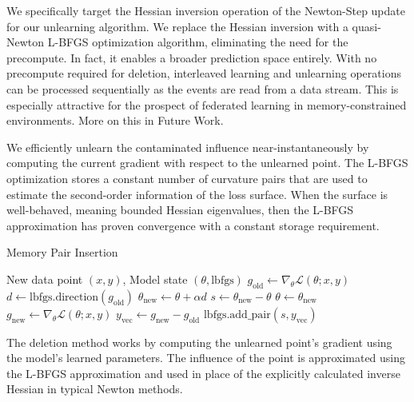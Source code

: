 \documentclass[a4paper,12pt]{article}
\begin{document}
We specifically target the Hessian inversion operation of the Newton-Step update for our unlearning algorithm. We replace the Hessian inversion with a quasi-Newton L-BFGS optimization algorithm, eliminating the need for the precompute. In fact, it enables a broader prediction space entirely. With no precompute required for deletion, interleaved learning and unlearning operations can be processed sequentially as the events are read from a data stream. This is especially attractive for the prospect of federated learning in memory-constrained environments. More on this in Future Work.

We efficiently unlearn the contaminated influence near-instantaneously by computing the current gradient with respect to the unlearned point. The L-BFGS optimization stores a constant number of curvature pairs that are used to estimate the second-order information of the loss surface. When the surface is well-behaved, meaning bounded Hessian eigenvalues, then the L-BFGS approximation has proven convergence with a constant storage requirement.

\begin{algorithm}
\caption{Memory Pair Insertion}\label{alg:insertion}
\begin{algorithmic}
\Require New data point $(x, y)$, Model state $(\theta, \text{lbfgs})$
\State $g_{\text{old}} \gets \nabla_{\theta} \mathcal{L}(\theta; x, y)$
\State $d \gets \text{lbfgs.direction}(g_{\text{old}})$
\State $\theta_{\text{new}} \gets \theta + \alpha d$
\State
\State $s \gets \theta_{\text{new}} - \theta$
\State $\theta \gets \theta_{\text{new}}$
\State $g_{\text{new}} \gets \nabla_{\theta} \mathcal{L}(\theta; x, y)$
\State $y_{\text{vec}} \gets g_{\text{new}} - g_{\text{old}}$
\State
\State $\text{lbfgs.add\_pair}(s, y_{\text{vec}})$
\end{algorithmic}
\end{algorithm}

The deletion method works by computing the unlearned point's gradient using the model's learned parameters. The influence of the point is approximated using the L-BFGS approximation and used in place of the explicitly calculated inverse Hessian in typical Newton methods. 
\end{document}
